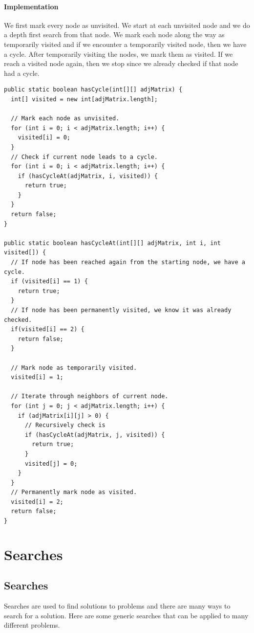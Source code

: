 \documentclass[11pt,oneside]{book}
\begin{document}
\subsection{Implementation}

We first mark every node as unvisited. We start at each unvisited node and we do a depth first search from that node. We mark each node along the way as temporarily visited and if we encounter a temporarily visited node, then we have a cycle. After temporarily visiting the nodes, we mark them as visited. If we reach a visited node again, then we stop since we already checked if that node had a cycle.

\begin{lstlisting}
public static boolean hasCycle(int[][] adjMatrix) {
  int[] visited = new int[adjMatrix.length];
  
  // Mark each node as unvisited.
  for (int i = 0; i < adjMatrix.length; i++) {
    visited[i] = 0;
  }
  // Check if current node leads to a cycle.
  for (int i = 0; i < adjMatrix.length; i++) {
    if (hasCycleAt(adjMatrix, i, visited)) {
      return true;
    }
  }
  return false;
}

public static boolean hasCycleAt(int[][] adjMatrix, int i, int visited[]) {
  // If node has been reached again from the starting node, we have a cycle.
  if (visited[i] == 1) {
    return true;
  }
  // If node has been permanently visited, we know it was already checked.
  if(visited[i] == 2) {
    return false;
  }
  
  // Mark node as temporarily visited.
  visited[i] = 1;
  
  // Iterate through neighbors of current node.
  for (int j = 0; j < adjMatrix.length; i++) {
    if (adjMatrix[i][j] > 0) {
      // Recursively check is 
      if (hasCycleAt(adjMatrix, j, visited)) {
        return true;
      }
      visited[j] = 0;
    }
  }
  // Permanently mark node as visited.
  visited[i] = 2;
  return false;
}
\end{lstlisting}

\part{ Searches }
    \chapter{ Searches }
        

Searches are used to find solutions to problems and there are many ways to search for a solution. Here are some generic searches that can be applied to many different problems.
\end{document}

